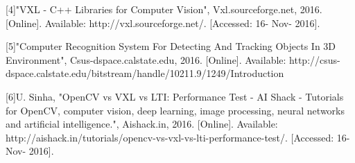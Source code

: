 \documentclass[letterpaper,10pt,onecolumn,draftclsnofoot]{IEEEtran}
\begin{document}
[4]"VXL - C++ Libraries for Computer Vision", Vxl.sourceforge.net, 2016. [Online]. Available: http://vxl.sourceforge.net/. [Accessed: 16- Nov- 2016].

[5]"Computer Recognition System For Detecting And Tracking Objects In 3D Environment", Csus-dspace.calstate.edu, 2016. [Online]. Available: http://csus-dspace.calstate.edu/bitstream/handle/10211.9/1249/Introduction%

[6]U. Sinha, "OpenCV vs VXL vs LTI: Performance Test - AI Shack - Tutorials for OpenCV, computer vision, deep learning, image processing, neural networks and artificial intelligence.", Aishack.in, 2016. [Online]. Available: http://aishack.in/tutorials/opencv-vs-vxl-vs-lti-performance-test/. [Accessed: 16- Nov- 2016].




\end{document}
